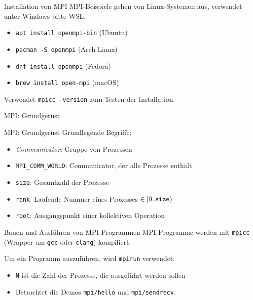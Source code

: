 \documentclass{beamer}
\begin{document}
\begin{frame}{Installation von MPI}
	MPI-Beispiele gehen von Linux-Systemen aus, verwendet unter Windows bitte WSL.

	\begin{itemize}
		\item \texttt{apt install openmpi-bin} (Ubuntu)
		\item \texttt{pacman -S openmpi} (Arch Linux)
		\item \texttt{dnf install openmpi} (Fedora)
                \item \texttt{brew install open-mpi} (macOS)
	\end{itemize}

	Verwendet \texttt{mpicc --version} zum Testen der Installation.
\end{frame}

\begin{frame}{MPI: Grundgerüst}
\end{frame}

\begin{frame}{MPI: Grundgerüst}
  Grundlegende Begriffe:

  \begin{itemize}
    \item \emph{Communicator}: Gruppe von Prozessen
    \item \texttt{MPI\_COMM\_WORLD}: Communicator, der alle Prozesse enthält
    \item \texttt{size}: Gesamtzahl der Prozesse
    \item \texttt{rank}: Laufende Nummer eines Prozesses $\in [0, \text{\texttt{size}})$
    \item \texttt{root}: Ausgangspunkt einer kollektiven Operation
  \end{itemize}
\end{frame}

\begin{frame}{Bauen und Ausführen von MPI-Programmen}
        MPI-Programme werden mit \texttt{mpicc} (Wrapper um \texttt{gcc} oder \texttt{clang}) kompiliert:


	Um ein Programm auszuführen, wird \texttt{mpirun} verwendet:


	\begin{itemize}
		\item \texttt{N} ist die Zahl der Prozesse, die ausgeführt werden sollen
                \item Betrachtet die Demos \texttt{mpi/hello} und \texttt{mpi/sendrecv}.
	\end{itemize}
\end{frame}
\end{document}
